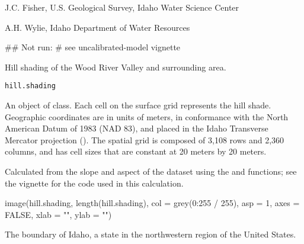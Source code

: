 \documentclass[a4paper]{book}
\begin{document}
%
\begin{Author}\relax
J.C. Fisher, U.S. Geological Survey, Idaho Water Science Center

A.H. Wylie, Idaho Department of Water Resources
\end{Author}
%
\begin{Examples}
\begin{ExampleCode}
## Not run: # see uncalibrated-model vignette
\end{ExampleCode}
\end{Examples}
%
\begin{Description}\relax
Hill shading of the Wood River Valley and surrounding area.
\end{Description}
%
\begin{Usage}
\begin{verbatim}
hill.shading
\end{verbatim}
\end{Usage}
%
\begin{Format}
An object of  class.
Each cell on the surface grid represents the hill shade.
Geographic coordinates are in units of meters, in conformance with the North American Datum of 1983 (NAD 83), and placed in the
Idaho Transverse Mercator projection ().
The spatial grid is composed of 3,108 rows and 2,360 columns, and has cell sizes that are constant at 20 meters by 20 meters.
\end{Format}
%
\begin{Source}\relax
Calculated from the slope and aspect of the  dataset using the  and  functions;
see the  vignette for the \R{} code used in this calculation.
\end{Source}
%
\begin{Examples}
\begin{ExampleCode}
image(hill.shading, length(hill.shading), col = grey(0:255 / 255), asp = 1,
      axes = FALSE, xlab = "", ylab = "")
\end{ExampleCode}
\end{Examples}
%
\begin{Description}\relax
The boundary of Idaho, a state in the northwestern region of the United States.
\end{Description}
\end{document}
